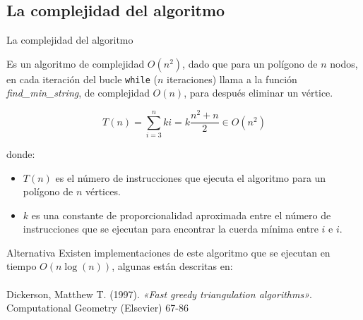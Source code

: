 \documentclass[compress]{beamer}
\begin{document}
\subsection{La complejidad del algoritmo}
\begin{frame}{La complejidad del algoritmo}


Es un algoritmo de complejidad $O(n^2)$, dado que para un polígono de $n$ nodos, en cada iteración del bucle \texttt{while} ($n$ iteraciones) llama a la función \textit{find\_min\_string}, de complejidad $O(n)$, para después eliminar un vértice.

\[
T(n) = \sum_{i=3}^n ki = k\frac{n^2+n}{2} \in O(n^2)
\]

donde:
\begin{itemize}
\item $T(n)$ es el número de instrucciones que ejecuta el algoritmo para un polígono de $n$ vértices.
\item $k$ es una constante de proporcionalidad aproximada entre el número de instrucciones que se ejecutan para encontrar la cuerda mínima entre $i$ e $i$. 

\end{itemize}
\end{frame}

\begin{frame}{Alternativa}
Existen implementaciones de este algoritmo que se ejecutan en tiempo $O(n\log(n))$, algunas están descritas en:
\hfill\\\hfill\\
Dickerson, Matthew T. (1997). \textit{«Fast greedy triangulation algorithms»}. Computational Geometry (Elsevier)  67-86
\end{frame}
\end{document}
